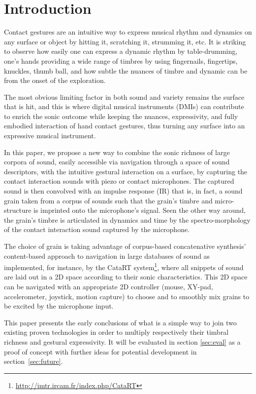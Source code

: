 \section{Introduction}


Contact gestures are an intuitive way to express musical rhythm and dynamics on any surface or object by hitting it, scratching it, strumming it, etc.  It is striking to observe how easily one can express a dynamic rhythm by table-drumming, one's hands providing a wide range of timbres by using fingernails, fingertips, knuckles, thumb ball, and how subtle the nuances of timbre and dynamic can be from the onset of the exploration.

The most obvious limiting factor in both sound and variety remains the surface that is hit, and this is where digital musical instruments (DMIs) can contribute to enrich the sonic outcome while keeping the nuances, expressivity, and fully embodied interaction of hand contact gestures, thus turning any surface into an expressive musical instrument.

In this paper, we propose a new way to combine the sonic richness of large corpora of sound, easily accessible via navigation through a space of sound descriptors, with the intuitive gestural interaction on a surface, by capturing the contact interaction sounds with piezo or contact microphones. The captured sound is then convolved with an impulse response (IR) that is, in fact, a sound grain taken from a corpus of sounds such that the grain's timbre and micro-structure is imprinted onto the microphone's signal.
Seen the other way around, the grain's timbre is articulated in dynamics and time by the spectro-morphology of the contact interaction sound captured by the microphone. 

The choice of grain is taking advantage of corpus-based concatenative synthesis' content-based approach to navigation in large databases of sound as implemented, for instance, by the CataRT system\footnote{\url{http://imtr.ircam.fr/index.php/CataRT}}, where all snippets of sound are laid out in a 2D space according to their sonic characteristics.  This 2D space can be navigated with an appropriate 2D controller (mouse, XY-pad, accelerometer, joystick, motion capture) to choose and to smoothly mix grains to be excited by the microphone input.

This paper presents the early conclusions of what is a simple way to join two existing proven technologies in order to multiply respectively their timbral richness and gestural expressivity. It will be evaluated in section \ref{sec:eval} as a proof of concept with further ideas for potential development in section~\ref{sec:future}.




